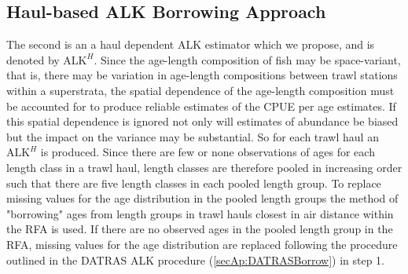 \documentclass[a4paper 12pt]{article}
\numberwithin{equation}{section}
\begin{document}
\subsection{\normalsize Haul-based ALK Borrowing Approach}
\label{secAp:oursBorrow}
\indent  The second is an a haul dependent ALK estimator which we propose, and is denoted by $\mathrm{ALK}^{H}$. Since the age-length composition of fish may be space-variant, that is, there may be variation in age-length compositions between trawl stations within a superstrata, the spatial dependence of the age-length composition must be accounted for to produce reliable estimates of the CPUE per age estimates. If this spatial dependence is ignored not only will estimates of abundance be biased but the impact on the variance may be substantial. So for each trawl haul an $\mathrm{ALK}^{H}$ is produced. Since there are few or none observations of ages for each length class in a trawl haul, length classes are therefore pooled in increasing order such that there are five length classes in each pooled length group. To replace missing values for the age distribution in the pooled length groups the method of "borrowing" ages from length groups in trawl hauls closest in air distance within the RFA is used. If there are no observed ages in the pooled length group in the RFA, missing values for the age distribution are replaced following the procedure outlined in the DATRAS ALK procedure (\ref{secAp:DATRASBorrow}) in step 1.  



%



 
\end{document}
